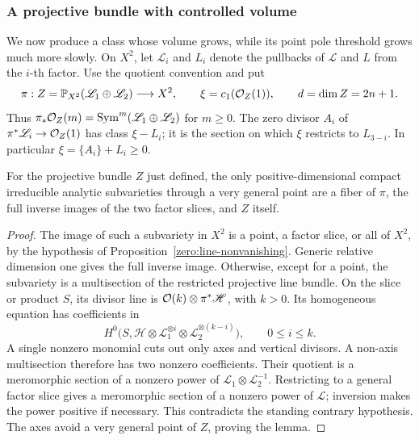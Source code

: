\subsubsection{A projective bundle with controlled volume}

We now produce a class whose volume grows, while its point pole threshold
grows much more slowly.  On \(X^2\), let \(\mathscr L_i\) and \(L_i\)
denote the pullbacks of \(\mathscr L\) and \(L\) from the \(i\)-th factor.
Use the quotient convention and put
\[
 \pi:Z=\mathbb{P}_{X^2}(\mathscr L_1\oplus\mathscr L_2)\longrightarrow X^2,
 \qquad \xi=c_1(\mathcal O_Z(1)),\qquad d=\dim Z=2n+1 .
\]
Thus \(\pi_*\mathcal O_Z(m)=\operatorname{Sym}^m(\mathscr L_1\oplus\mathscr L_2)\) for
\(m\ge0\).  The zero divisor \(A_i\) of
\(\pi^*\mathscr L_i\to\mathcal O_Z(1)\) has class \(\xi-L_i\); it is the
section on which \(\xi\) restricts to \(L_{3-i}\).  In particular
\(\xi=\{A_i\}+L_i\ge0\).

\begin{lemma}\label{zero:subvarieties}
For the projective bundle \(Z\) just defined, the only
positive-dimensional compact irreducible analytic subvarieties through
a very general point are a fiber of \(\pi\), the full inverse images of
the two factor slices, and \(Z\) itself.
\end{lemma}

\begin{proof}
The image of such a subvariety in \(X^2\) is a point, a factor slice,
or all of \(X^2\), by the hypothesis of
Proposition~\ref{zero:line-nonvanishing}.  Generic relative dimension
one gives the full inverse image.  Otherwise, except for a point, the
subvariety is a multisection of the restricted projective line bundle.
On the slice or product \(S\), its divisor line is
\(\mathcal O(k)\otimes\pi^*\mathscr H\), with \(k>0\).  Its homogeneous
equation has coefficients in
\[
 H^0\bigl(S,\mathscr H\otimes
       \mathscr L_1^{\otimes i}\otimes
       \mathscr L_2^{\otimes(k-i)}\bigr),\qquad 0\le i\le k.
\]
A single nonzero monomial cuts out only axes and vertical divisors.
A non-axis multisection therefore has two nonzero coefficients.  Their
quotient is a meromorphic section of a nonzero power of
\(\mathscr L_1\otimes\mathscr L_2^{-1}\).  Restricting to a general
factor slice gives a meromorphic section of a nonzero power of
\(\mathscr L\); inversion makes the power positive if necessary.
This contradicts the standing contrary hypothesis.  The axes
avoid a very general point of \(Z\), proving the lemma.
\end{proof}

